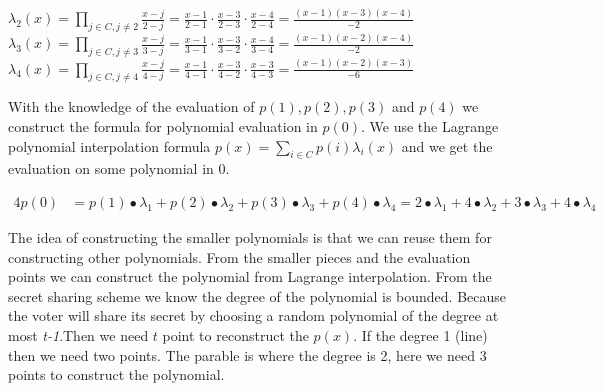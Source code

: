 \begin{center}
\begin{math} \lambda_2(x)=\prod\limits_{j\in C,j\neq2} \frac{x-j}{2-j} = \frac{x-1}{2-1} \cdot \frac{x-3}{2-3} \cdot \frac{x-4}{2-4}=\frac{(x-1)(x-3)(x-4)}{-2} \end{math}\\ 

\begin{math} \lambda_3(x)=\prod\limits_{j\in C,j\neq3} \frac{x-j}{3-j} = \frac{x-1}{3-1} \cdot \frac{x-3}{3-2} \cdot \frac{x-4}{3-4}=\frac{(x-1)(x-2)(x-4)}{-2} \end{math}\\ 

\begin{math} \lambda_4(x)=\prod\limits_{j\in C,j\neq4} \frac{x-j}{4-j} = \frac{x-1}{4-1} \cdot \frac{x-3}{4-2} \cdot \frac{x-3}{4-3}=\frac{(x-1)(x-2)(x-3)}{-6} \end{math}\\ 
\end{center}

\noindent
With the knowledge of the evaluation of \begin{math}p(1), p(2), p(3)\end{math} and  \begin{math}p(4)\end{math} we construct the formula for polynomial evaluation in \begin{math}p(0)\end{math}. We use the Lagrange polynomial interpolation formula \begin{math}p(x)=\sum\limits_{i \in C} p(i)\lambda_i(x)\end{math} and we get the evaluation on some polynomial in $0$.


\noindent
\begin{alignat*}{4}
p(0) &=p(1)∙\lambda_1+p(2)∙\lambda_2+p(3)∙\lambda_3+p(4)∙\lambda_4=2∙\lambda_1+4∙\lambda_2+3∙\lambda_3+4∙\lambda_4  
\end{alignat*}



\noindent
The idea of constructing the smaller polynomials is that we can reuse them for constructing other polynomials. From the smaller pieces and the evaluation points we can construct the polynomial from Lagrange interpolation. From the secret sharing scheme we know the degree of the polynomial is bounded. Because the voter will share its secret by choosing a random polynomial of the degree at most \textit{t-1}.Then we need $t$ point to reconstruct the $p(x)$. If the degree 1 (line) then we need two points. The parable is where the degree is 2, here we need 3 points to construct
the polynomial.

